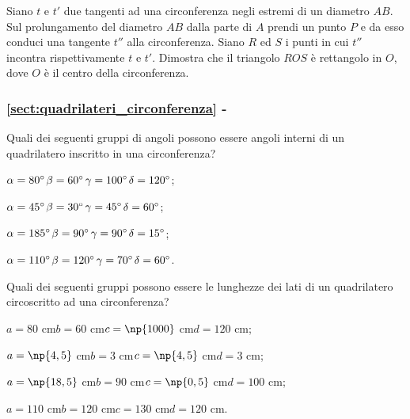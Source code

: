 \begin{multicols}{2}
\begin{esercizio}
\label{ese:5.40}
Siano $t$ e $t'$ due tangenti ad una circonferenza negli estremi di un diametro $AB$. Sul prolungamento del diametro $AB$ dalla parte di $A$ prendi un punto $P$ e da esso conduci una tangente $t''$ alla circonferenza. Siano $R$ ed $S$ i punti in cui $t''$ incontra rispettivamente $t$ e $t'$.  Dimostra che il triangolo $ROS$ è rettangolo in $O$, dove $O$ è il centro della circonferenza.
\end{esercizio}

\end{multicols}

\begingroup
\hypersetup{linkcolor=black}
\subsubsection*{\ref{sect:quadrilateri_circonferenza} - }
\endgroup

\begin{esercizio}
\label{ese:5.41}
Quali dei seguenti gruppi di angoli possono essere angoli interni di un quadrilatero inscritto in una circonferenza?
\begin{enumeratea}
\item $\alpha=80{}^{\circ}$\tab	$\beta=60{}^{\circ}$\tab $\gamma=100{}^{\circ}$\tab $\delta=120{}^{\circ}$;
\item $\alpha=45{}^{\circ}$\tab	$\beta=30{}^{\circ}$\tab $\gamma=45{}^{\circ}$\tab $\delta=60{}^{\circ}$;
\item $\alpha=185{}^{\circ}$\tab $\beta=90{}^{\circ}$\tab $\gamma=90{}^{\circ}$\tab $\delta=15{}^{\circ}$;
\item $\alpha=110{}^{\circ}$\tab $\beta=120{}^{\circ}$\tab $\gamma=70{}^{\circ}$\tab $\delta=60{}^{\circ}$.
\end{enumeratea}
\end{esercizio}

\begin{esercizio}
\label{ese:5.42}
Quali dei seguenti gruppi possono essere le lunghezze dei lati di un quadrilatero circoscritto ad una circonferenza?
\begin{enumeratea}
\item $a=80$ cm\tab	$b=60$ cm\tab $c=\np{1000}$ cm\tab $d=120$ cm;
\item $a=\np{4,5}$ cm\tab $b=3$ cm\tab $c=\np{4,5}$ cm\tab $d=3$ cm;
\item $a=\np{18,5}$ cm\tab $b=90$ cm\tab $c=\np{0,5}$ cm\tab $d=100$ cm;
\item $a=110$ cm\tab $b=120$ cm\tab $c=130$ cm\tab $d=120$ cm.
\end{enumeratea}
\end{esercizio}

